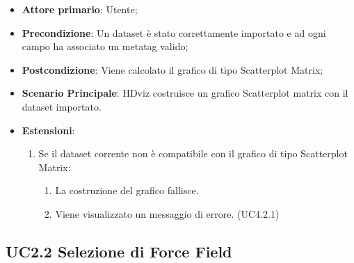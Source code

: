 \begin{itemize}

    \item \textbf{Attore primario}: Utente;

    \item \textbf{Precondizione}:   Un dataset è stato correttamente importato e ad ogni campo ha associato
                                    un metatag valido;

    \item \textbf{Postcondizione}:  Viene calcolato il grafico di tipo Scatterplot Matrix;

	\item \textbf{Scenario Principale}: HDviz costruisce un grafico Scatterplot matrix con il dataset 
										importato.
	
	\item \textbf{Estensioni}:
	\begin{enumerate}
		\item Se il dataset corrente non è compatibile con il grafico di tipo Scatterplot Matrix:
		\begin{enumerate}
			\item La costruzione del grafico fallisce.
			\item Viene visualizzato un messaggio di errore. (UC4.2.1)
		\end{enumerate}
	\end{enumerate}
\end{itemize}


\subsection{UC2.2 Selezione di Force Field}

